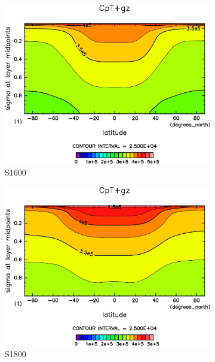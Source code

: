 \documentclass[body]{subfiles}
\begin{document}
\begin{figure}[t]
\begin{subfigure}{.4\textwidth}
		\includegraphics[width=\columnwidth]{S1600/CpT+gz,time=3650:4015-crop-rotate.pdf}
		\caption{S1600}\label{CpT+gzS1600}
	\end{subfigure}
	\begin{subfigure}{.4\textwidth}
		\centering
		\includegraphics[width=\columnwidth]{S1800/CpT+gz,time=3650:4015-crop-rotate.pdf}
		\caption{S1800}\label{CpT+gzS1800}
	\end{subfigure}
	\begin{subfigure}{.4\textwidth}
		\centering

\end{subfigure}
\end{figure}
\end{document}
